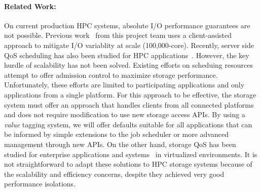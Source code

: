 

\paragraph{Related Work:}
On current production HPC systems, absolute I/O performance guarantees are not
possible. Previous work~\cite{lofstead:2010:io-variability,liu_hotstorage} from
this project team uses a client-assisted approach to mitigate I/O variablity at
scale (100,000-core).  Recently, server side QoS scheduling has also been
studied for HPC applications~\cite{Dai:2014,msst2012,vPFS-TOS}.  However, the key hurdle of
scalability has not been solved.  Existing efforts on scheduing
resources~\cite{thapaliya:2014:io-cop,dorier:2014:calciom} attempt to offer
admission control to maximize storage performance. Unfortunately, these efforts
are limited to participating applications and only applications from a single
platform. For this approach to be effective, the storage system must offer an
approach that handles clients from all connected platforms and does not require
modification to use new storage access APIs. By using a {\it value} tagging
system, we will offer defaults suitable for all applications that can be
informed by simple extensions to the job scheduler or more advanced management
through new APIs. On the other hand, storage QoS has been studied for
enterprise applications and systems~\cite{Gulati:2007,Gulati:2010,Gulati:2012}
in virtualized environments. It is not straightforward to adapt these solutions
to HPC storage systems because of the scalability and efficiency concerns,
despite they achieved very good performance isolations.

